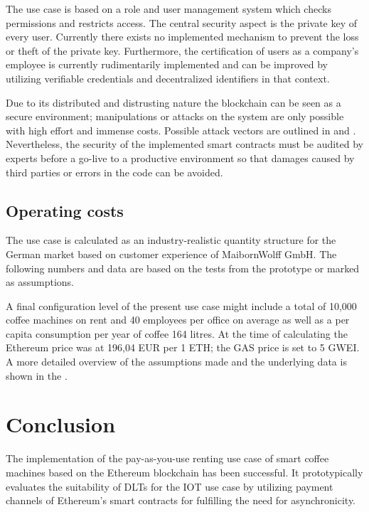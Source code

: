 \documentclass[conference]{IEEEtran}
\begin{document}
The use case is based on a role and user management system which checks permissions and restricts access. The central security aspect is the private key of every user. Currently there exists no implemented mechanism to prevent the loss or theft of the private key. Furthermore, the certification of users as a company's employee is currently rudimentarily implemented and can be improved by utilizing verifiable credentials and decentralized identifiers in that context.

Due to its distributed and distrusting nature the blockchain can be seen as a secure environment; manipulations or attacks on the system are only possible with high effort and immense costs. Possible attack vectors are outlined in \cite{EthereumSecurity} and \cite{BlockchainSecurity}. Nevertheless, the security of the implemented smart contracts must be audited by experts before a go-live to a productive environment so that damages caused by third parties or errors in the code can be avoided.

%
\subsection{Operating costs}

The use case is calculated as an industry-realistic quantity structure for the German market based on customer experience of MaibornWolff GmbH. The following numbers and data are based on the tests from the prototype or marked as assumptions.

A final configuration level of the present use case might include a total of 10,000 coffee machines on rent and 40 employees per office on average as well as a per capita consumption per year of coffee 164 litres. At the time of calculating the Ethereum price was at 196,04 EUR per 1 ETH; the GAS price is set to 5 GWEI. A more detailed overview of the assumptions made and the underlying data is shown in the .

%
\section{Conclusion}

The implementation of the pay-as-you-use renting use case of smart coffee machines based on the Ethereum blockchain has been successful. It prototypically evaluates the suitability of DLTs for the IOT use case by utilizing payment channels of Ethereum's smart contracts for fulfilling the need for asynchronicity.
\end{document}
